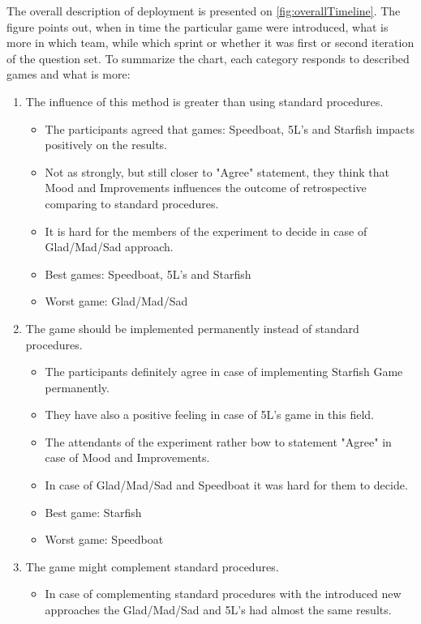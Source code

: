 The overall description of deployment is presented on \autoref{fig:overallTimeline}. The figure points out, when in time the particular game were introduced, what is more in which team, while which sprint or whether it was first or second iteration of the question set.
To summarize the chart, each category responds to described games and what is more:
\begin{enumerate}
    \item The influence of this method is greater than using standard procedures.
    \begin{itemize}
        \item The participants agreed that games: Speedboat, 5L's and Starfish impacts positively on the results. \item Not as strongly, but still closer to "Agree" statement, they think that Mood and Improvements influences the outcome of retrospective comparing to standard procedures.
        \item It is hard for the members of the experiment to decide in case of Glad/Mad/Sad approach.
        \item Best games: Speedboat, 5L's and Starfish
        \item Worst game: Glad/Mad/Sad
    \end{itemize}
    \item The game should be implemented permanently instead of standard procedures.
    \begin{itemize}
        \item The participants definitely agree in case of implementing Starfish Game permanently.
        \item They have also a positive feeling in case of 5L's game in this field.
        \item The attendants of the experiment rather bow to statement "Agree" in case of Mood and Improvements.
        \item In case of Glad/Mad/Sad and Speedboat it was hard for them to decide.
        \item Best game: Starfish
        \item Worst game: Speedboat
    \end{itemize}
    \item The game might complement standard procedures.
    \begin{itemize}
        \item In case of complementing standard procedures with the introduced new approaches the Glad/Mad/Sad and 5L's had almost the same results.

\end{itemize}
\end{enumerate}
